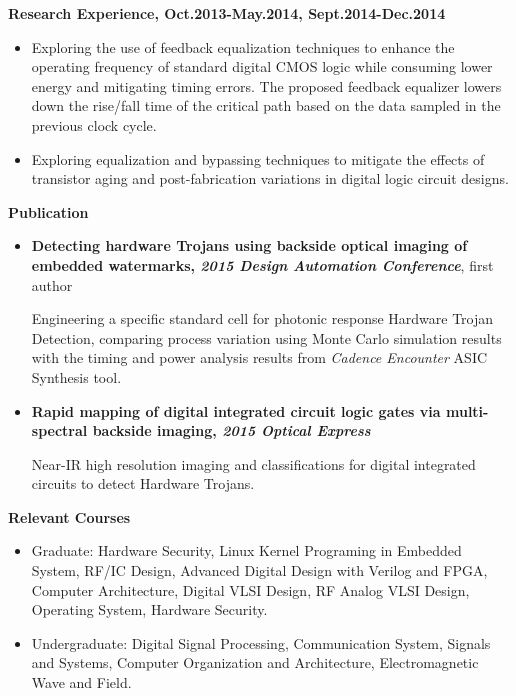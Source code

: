 \documentclass[]{article}
\begin{document}
\noindent \textbf{Research Experience, Oct.2013-May.2014, Sept.2014-Dec.2014}
		\begin{itemize}
            \item Exploring the use of feedback equalization techniques to
            enhance the operating frequency of standard digital CMOS logic
            while consuming lower energy and mitigating timing errors. The
            proposed feedback equalizer lowers down the rise/fall time of
            the critical path based on the data sampled in the previous
            clock cycle. 

            \item Exploring equalization and bypassing techniques to mitigate
            the effects of transistor aging and post-fabrication
            variations in digital logic circuit designs.
		
        \end{itemize}

\noindent \textbf{Publication}
\begin{itemize}
    \item \textbf{Detecting hardware Trojans using backside optical imaging of
    embedded watermarks, \textit{2015 Design Automation Conference}}, first author
    
    Engineering a specific standard cell for photonic response Hardware Trojan Detection, comparing
    process variation using Monte Carlo simulation results with the timing and power analysis
    results from \textit{Cadence Encounter} ASIC Synthesis tool.

    \item \textbf{Rapid mapping of digital integrated circuit logic gates via multi-spectral backside
    imaging, \textit{2015 Optical Express}}

    Near-IR high resolution imaging and classifications for digital integrated circuits to detect
    Hardware Trojans.
\end{itemize}

\noindent \textbf{Relevant Courses}
\begin{itemize}
\item Graduate:
                    Hardware Security, Linux Kernel Programing in Embedded System, RF/IC Design,
                    Advanced Digital Design with Verilog and FPGA, Computer
                    Architecture, Digital VLSI Design, RF Analog VLSI Design,
                    Operating System, Hardware Security.
\item Undergraduate:
                    Digital Signal Processing, Communication System, Signals
                    and Systems, Computer Organization and 
                    Architecture, Electromagnetic Wave and Field. 
\end{itemize}
\end{document}
